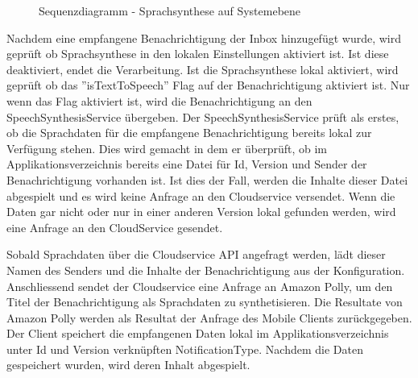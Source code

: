 \begin{figure}[h]
    \centering
    \begin{minipage}[b]{1\textwidth}
        \caption{Sequenzdiagramm - Sprachsynthese auf Systemebene}
    \end{minipage}
\end{figure}


Nachdem eine empfangene Benachrichtigung der Inbox hinzugefügt wurde, wird geprüft ob Sprachsynthese in den lokalen Einstellungen aktiviert ist.
Ist diese deaktiviert, endet die Verarbeitung.
Ist die Sprachsynthese lokal aktiviert, wird geprüft ob das ''isTextToSpeech'' Flag auf der Benachrichtigung aktiviert ist.
Nur wenn das Flag aktiviert ist, wird die Benachrichtigung an den SpeechSynthesisService übergeben.
Der SpeechSynthesisService prüft als erstes, ob die Sprachdaten für die empfangene Benachrichtigung bereits lokal zur Verfügung stehen.
Dies wird gemacht in dem er überprüft, ob im Applikationsverzeichnis bereits eine Datei für Id, Version und Sender der Benachrichtigung vorhanden ist.
Ist dies der Fall, werden die Inhalte dieser Datei abgespielt und es wird keine Anfrage an den Cloudservice versendet.
Wenn die Daten gar nicht oder nur in einer anderen Version lokal gefunden werden, wird eine Anfrage an den CloudService gesendet.

Sobald Sprachdaten über die Cloudservice API angefragt werden, lädt dieser Namen des Senders und die Inhalte der Benachrichtigung aus der Konfiguration.
Anschliessend sendet der Cloudservice eine Anfrage an Amazon Polly, um den Titel der Benachrichtigung als Sprachdaten zu synthetisieren.
Die Resultate von Amazon Polly werden als Resultat der Anfrage des Mobile Clients zurückgegeben.
Der Client speichert die empfangenen Daten lokal im Applikationsverzeichnis unter Id und Version verknüpften NotificationType.
Nachdem die Daten gespeichert wurden, wird deren Inhalt abgespielt.

\clearpage
